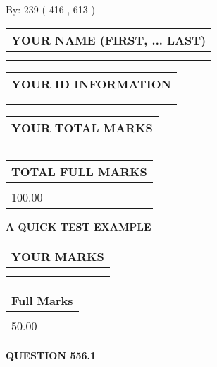 \documentclass[12pt]{article}
\begin{document}
   
\hspace{1.0in} By: 
 239 ( 416 ,  613 )
   
   
   
   
\newpage 
\setcounter{page}{ 
   556001 } 
   
   
   
   
\noindent\begin{tabular}{|l|}
\hline
YOUR NAME (FIRST, ... LAST)  \\
\hline
 \\ 
 \\ 
\hline
\end{tabular}
\hspace{0.05in} \begin{tabular}{|l|}
\hline
 YOUR   ID   INFORMATION  \\
\hline
 \\ 
 \\ 
\hline
\end{tabular}
   
   
\vspace{0.2in}\noindent\begin{tabular}{|l|}
\hline
YOUR TOTAL MARKS  \\
\hline
 \\ 
 \\ 
\hline
\end{tabular}
\hspace{0.05in} \begin{tabular}{|l|}
\hline
TOTAL FULL MARKS  \\
\hline
 \\ 
100.00 \\
\hline
\end{tabular}
   
   
 \vspace{0.2in}
{\LARGE {\textbf{ A QUICK TEST EXAMPLE}}}
   
   
  
\vspace{0.2in}
  
\noindent\begin{tabular}{|l|}
\hline
 YOUR MARKS  \\
\hline
 \\ 
 \\ 
\hline
\end{tabular}
\hspace{0.05in} \begin{tabular}{|l|}
\hline
 Full Marks  \\
\hline
 \\ 
50.00 \\
\hline
\end{tabular}
{\textbf{\Large{QUESTION
556.1 
}}}
  
\end{document}
